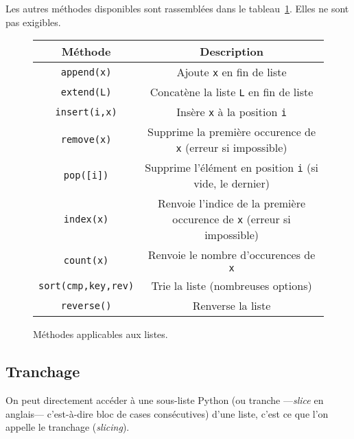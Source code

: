 Les autres méthodes disponibles sont rassemblées dans le tableau~\ref{tab.list.methodes}. Elles ne sont pas exigibles.
\begin{figure}[!h]
  \begin{center}
    \begin{tabular}{|c|c|}
      \hline 
      Méthode & Description \\
      \hline
      \texttt{append(x)} & Ajoute \texttt{x} en fin de liste \\
      \hline
      \texttt{extend(L)} & Concatène la liste \texttt{L} en fin de liste \\
      \hline
      \texttt{insert(i,x)} & Insère  \texttt{x} à la position \texttt{i} \\
      \hline
      \texttt{remove(x)} & Supprime la première occurence de \texttt{x} (erreur si impossible)\\
      \hline
      \texttt{pop([i])} & Supprime l'élément en position \texttt{i} (si vide, le dernier) \\
      \hline 
      \texttt{index(x)} & Renvoie l'indice de la première occurence de \texttt{x} (erreur si impossible)\\
      \hline
      \texttt{count(x)} & Renvoie le nombre d'occurences de \texttt{x} \\
      \hline
      \texttt{sort(cmp,key,rev)} & Trie la liste (nombreuses options) \\
      \hline
      \texttt{reverse()} & Renverse la liste \\
      \hline
    \end{tabular}
  \end{center}
  \caption{Méthodes applicables aux listes.}
  \label{tab.list.methodes}
\end{figure}

\clearslide{}
\subsection{Tranchage}

On peut directement accéder à une sous-liste Python (ou tranche ---\emph{slice} en anglais--- 
c'est-à-dire bloc de cases consécutives) d'une liste, c'est ce que l'on appelle le tranchage 
(\textit{slicing}).

